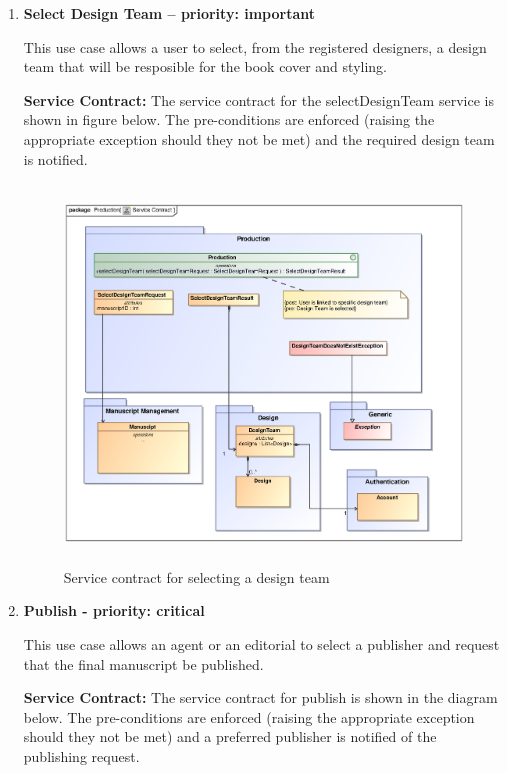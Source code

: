 \begin{enumerate}
\newpage
\item \textbf{Select Design Team – priority: important}\\
\par{This use case allows a user to select, from the registered designers, a design team that will be resposible for the book cover and styling.}

\textbf{Service Contract:} 
The service contract for the selectDesignTeam service is shown in figure below. The pre-conditions are enforced (raising the appropriate exception should they not be met) and the required design team is notified.

\begin{figure}[h]
\includegraphics[height=380px, width=500px]{epsImages/Production/SelectDesignTeam.eps}
\caption{Service contract for selecting a design team}
\end{figure}


\newpage
\item \textbf{Publish - priority: critical}
\par{This use case allows an agent or an editorial to select a publisher and request that the final manuscript be published.}

\textbf{Service Contract:} 
The service contract for publish is shown in the diagram below. The pre-conditions are enforced (raising the appropriate exception should they not be met) and a preferred publisher is notified of the publishing request.


\end{enumerate}
